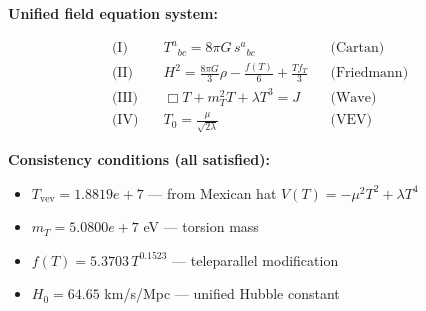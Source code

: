 
\textbf{Unified field equation system:}

\begin{align}
  \text{(I)} \quad & T^a{}_{bc} = 8\pi G \, s^a{}_{bc} && \text{(Cartan)} \\
  \text{(II)} \quad & H^2 = \frac{8\pi G}{3}\rho - \frac{f(T)}{6} + \frac{Tf_T}{3} && \text{(Friedmann)} \\
  \text{(III)} \quad & \Box T + m_T^2 T + \lambda T^3 = J && \text{(Wave)} \\
  \text{(IV)} \quad & T_0 = \frac{\mu}{\sqrt{2\lambda}} && \text{(VEV)}
\end{align}

\textbf{Consistency conditions (all satisfied):}
\begin{itemize}
  \item $T_{\text{vev}} = 1.8819e+7$ — from Mexican hat $V(T) = -\mu^2 T^2 + \lambda T^4$
  \item $m_T = 5.0800e+7$ eV — torsion mass
  \item $f(T) = 5.3703 \, T^{0.1523}$ — teleparallel modification
  \item $H_0 = 64.65$ km/s/Mpc — unified Hubble constant
\end{itemize}